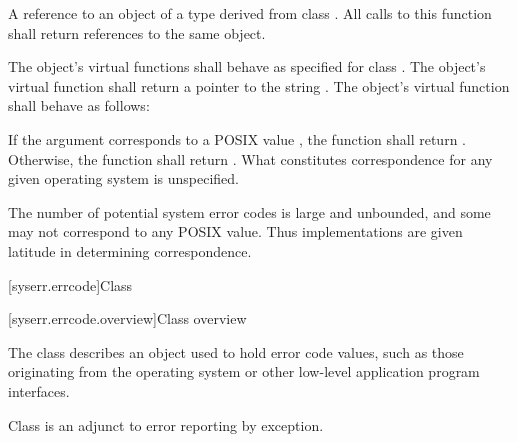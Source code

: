 \begin{itemdescr}
\pnum
\returns A reference to an object of a type derived from class .
All calls to this function shall return references to the same object.

\pnum
\remarks The object's  virtual functions shall behave as specified for
class . The object's  virtual function shall return a
pointer to the string . The object's 
virtual function shall behave as follows:

If the argument  corresponds to a POSIX  value , the
function shall return .
Otherwise, the function shall return . What constitutes correspondence for any given operating
system is unspecified. \begin{note} The number of potential system error codes is large
and unbounded, and some may not correspond to any POSIX  value. Thus
implementations are given latitude in determining correspondence. \end{note}
\end{itemdescr}

[syserr.errcode]{Class }

[syserr.errcode.overview]{Class  overview}

\pnum
The class  describes an object used to hold error code
values, such as those originating from the operating system or other low-level
application program interfaces. \begin{note} Class  is an
adjunct to error reporting by exception. \end{note}

